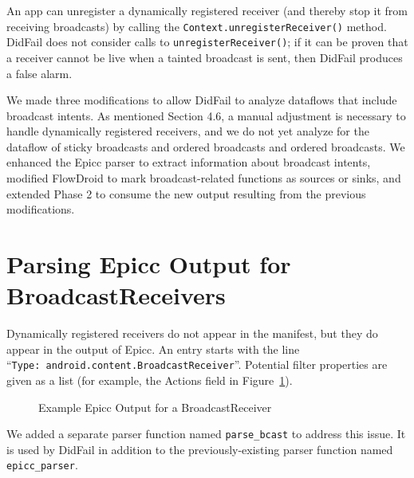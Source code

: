 An app can unregister a dynamically registered receiver (and thereby stop it from receiving broadcasts) by calling the \texttt{Context.unregisterReceiver()} method.  DidFail does not consider calls to \texttt{unregisterReceiver()}; if it can be proven that a receiver cannot be live when a tainted broadcast is sent, then DidFail produces a false alarm.

We made three modifications to allow DidFail to analyze dataflows that include broadcast intents. As mentioned Section 4.6, a manual adjustment is necessary to handle dynamically registered receivers, and we do not yet analyze for the dataflow of sticky broadcasts and ordered broadcasts and ordered broadcasts. We enhanced the Epicc parser to extract information about broadcast intents, modified FlowDroid to mark broadcast-related functions as sources or sinks, and extended Phase 2 to consume the new output resulting from the previous modifications.

\section{Parsing Epicc Output for BroadcastReceivers}
Dynamically registered receivers do not appear in the manifest, but they do appear in the output of Epicc.  An entry starts with the line ``\texttt{Type:\ android.content.BroadcastReceiver}''.  Potential filter properties are given as a list (for example, the Actions field in Figure~\ref{fig:bcast_epicc_output}).

\begin{figure}[!h]
\begin{framed}

\caption{Example Epicc Output for a BroadcastReceiver}
\label{fig:bcast_epicc_output}
\end{framed}
\end{figure}

We added a separate parser function named \texttt{parse\_bcast} to address this issue. It is used by DidFail in addition to the previously-existing parser function named \texttt{epicc\_parser}.

